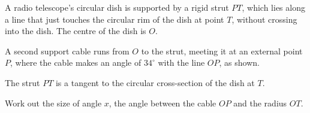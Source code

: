 \documentclass[11pt]{article}
\begin{document}
\begin{question}
\noindent A radio telescope's circular dish is supported by a rigid strut $PT$, which lies along a line that just touches the circular rim of the dish at point $T$, without crossing into the dish. The centre of the dish is $O$.

A second support cable runs from $O$ to the strut, meeting it at an external point $P$, where the cable makes an angle of $34^\circ$ with the line $OP$, as shown.

\begin{center}
\end{center}

\noindent The strut $PT$ is a tangent to the circular cross-section of the dish at $T$.

\noindent Work out the size of angle $x$, the angle between the cable $OP$ and the radius $OT$.

\vspace{4cm}
\begin{flushright}
\end{flushright}
\end{question}
\end{document}
